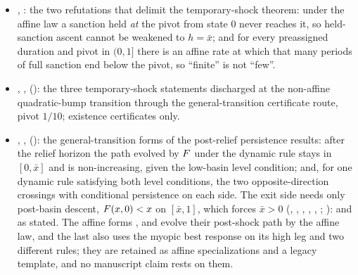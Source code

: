 \begin{itemize}[leftmargin=1.4em,itemsep=1pt]
\item {}, : the two refutations that delimit the temporary-shock theorem: under the affine law a sanction held \emph{at} the pivot from state $0$ never reaches it, so held-sanction ascent cannot be weakened to $h=\bar x$; and for every preassigned duration and pivot in $(0,1]$ there is an affine rate at which that many periods of full sanction end below the pivot, so ``finite'' is not ``few''.
\item {}, ,  (): the three temporary-shock statements discharged at the non-affine quadratic-bump transition through the general-transition certificate route, pivot $1/10$; existence certificates only.
\item {}, ,  (): the general-transition forms of the post-relief persistence results: after the relief horizon the path evolved by $F$ under the dynamic rule stays in $[0,\bar x]$ and is non-increasing, given the low-basin level condition; and, for one dynamic rule satisfying both level conditions, the two opposite-direction crossings with conditional persistence on each side. The exit side needs only post-basin descent, $F(x,0)<x$ on $[\bar x,1]$, which forces $\bar x>0$ (, , , , , ; ):  and  as stated. The affine forms ,  and  evolve their post-shock path by the affine law, and the last also uses the myopic best response on its high leg and two different rules; they are retained as affine specializations and a legacy template, and no manuscript claim rests on them.

\end{itemize}
